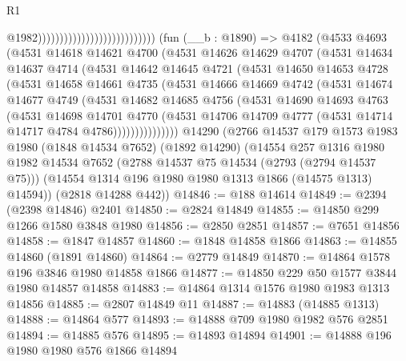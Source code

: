 \begin{lexlean}{R1}
\begin{coremodule}
                                                          @1982)))))))))))))))))))))))))))
    (fun (__b : @1890) =>
    @4182
      (@4533
        @4693
        (@4531
          @14618
          @14621
          @4700
          (@4531
            @14626
            @14629
            @4707
            (@4531
              @14634
              @14637
              @4714
              (@4531
                @14642
                @14645
                @4721
                (@4531
                  @14650
                  @14653
                  @4728
                  (@4531
                    @14658
                    @14661
                    @4735
                    (@4531
                      @14666
                      @14669
                      @4742
                      (@4531
                        @14674
                        @14677
                        @4749
                        (@4531
                          @14682
                          @14685
                          @4756
                          (@4531
                            @14690
                            @14693
                            @4763
                            (@4531
                              @14698
                              @14701
                              @4770
                              (@4531
                                @14706
                                @14709
                                @4777
                                (@4531 @14714 @14717 @4784 @4786)))))))))))))))
    @14290
    (@2766
      @14537
      @179
      @1573
      @1983
      @1980
      (@1848 @14534 @7652)
      (@1892 @14290)
      (@14554
        @257
        @1316
        @1980
        @1982
        @14534
        @7652
        (@2788 @14537 @75 @14534 (@2793 (@2794 @14537 @75)))
        (@14554 @1314 @196 @1980 @1980 @1313 @1866 (@14575 @1313) @14594))
      (@2818 @14288 @442))
@14846 := @188 @14614
@14849 := @2394 (@2398 @14846) @2401
@14850 := @2824 @14849
@14855 := @14850 @299 @1266 @1580 @3848 @1980
@14856 := @2850 @2851
@14857 := @7651 @14856
@14858 := @1847 @14857
@14860 := @1848 @14858 @1866
@14863 := @14855 @14860 (@1891 @14860)
@14864 := @2779 @14849
@14870 := @14864 @1578 @196 @3846 @1980 @14858 @1866
@14877 := @14850 @229 @50 @1577 @3844 @1980 @14857 @14858
@14883 := @14864 @1314 @1576 @1980 @1983 @1313 @14856
@14885 := @2807 @14849 @11
@14887 := @14883 (@14885 @1313)
@14888 := @14864 @577
@14893 := @14888 @709 @1980 @1982 @576 @2851
@14894 := @14885 @576
@14895 := @14893 @14894
@14901 := @14888 @196 @1980 @1980 @576 @1866 @14894

\end{coremodule}
\end{lexlean}
